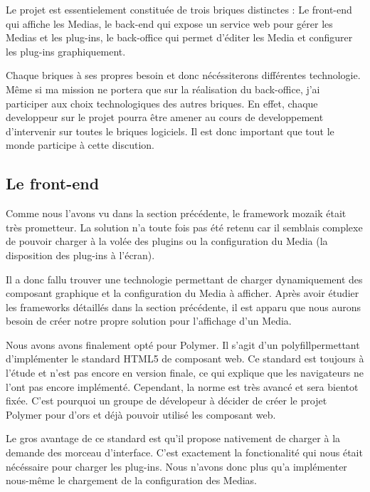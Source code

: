 Le projet est essentielement constituée de trois briques distinctes : Le front-end qui affiche les Medias, le back-end qui expose un \gls{service web} pour gérer les Medias et les plug-ins, le back-office qui permet d'éditer les Media et configurer les plug-ins graphiquement.

Chaque briques à ses propres besoin et donc nécéssiterons différentes technologie. Même si ma mission ne portera que sur la réalisation du back-office, j'ai participer aux choix technologiques des autres briques. En effet, chaque developpeur sur le projet pourra être amener au cours de developpement d'intervenir sur toutes le briques logiciels. Il est donc important que tout le monde participe à cette discution.

\subsection{Le front-end}

  Comme nous l'avons vu dans la section précédente, le framework mozaik était très prometteur. La solution n'a toute fois pas été retenu car il semblais complexe de pouvoir charger à la volée des plugins ou la configuration du Media (la disposition des plug-ins à l'écran).

  Il a donc fallu trouver une technologie permettant de charger dynamiquement des composant graphique et la configuration du Media à afficher. Après avoir étudier les \glspl{framework} détaillés dans la section précédente, il est apparu que nous aurons besoin de créer notre propre solution pour l'affichage d'un Media.

  Nous avons avons finalement opté pour \gls{Polymer}. Il s'agit d'un \gls{polyfill}\footnotemark permettant d'implémenter le standard HTML5 de composant web. Ce standard est toujours à l'étude et n'est pas encore en version finale, ce qui explique que les navigateurs ne l'ont pas encore implémenté. Cependant, la norme est très avancé et sera bientot fixée. C'est pourquoi un groupe de dévelopeur à décider de créer le projet \gls{Polymer} pour d'ors et déjà pouvoir utilisé les composant web.


  Le gros avantage de ce standard est qu'il propose nativement de charger à la demande des morceau d'interface. C'est exactement la fonctionalité qui nous était nécéssaire pour charger les plug-ins. Nous n'avons donc plus qu'a implémenter nous-même le chargement de la configuration des Medias.


